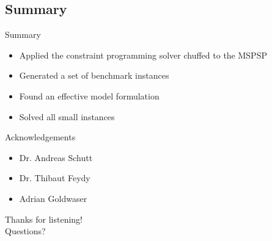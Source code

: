 \documentclass{beamer}
\begin{document}
\subsection{Summary}
\begin{frame}{Summary}
	\begin{itemize}
		\item Applied the constraint programming solver chuffed to the MSPSP\pause
		\vspace{2mm}
		\item Generated a set of benchmark instances\pause
		\vspace{2mm}
		\item Found an effective model formulation\pause
		\vspace{2mm}
		\item Solved all small instances
	\end{itemize}
\end{frame}


\begin{frame}{Acknowledgements}
	\begin{itemize}
		\item Dr. Andreas Schutt
		\vspace{2mm}
		\item Dr. Thibaut Feydy
		\vspace{2mm}
		\item Adrian Goldwaser
	\end{itemize}
\end{frame}

\begin{frame}{}
	\centering
	{\Large Thanks for listening!\vspace{1cm}\\
	Questions?}
\end{frame}
\end{document}
